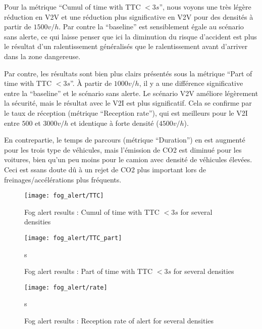 \documentclass[a4paper,10pt]{article}
\begin{document}
Pour la métrique ``Cumul of time with TTC $< 3 s$'', nous voyons une très légère réduction en V2V et une réduction plus significative en V2V pour des densités à partir de $1500 v/h$. Par contre la ``baseline'' est sensiblement égale au scénario sans alerte, ce qui laisse penser que ici la diminution du risque d'accident est plus le résultat d'un ralentissement généralisés que le ralentissement avant d'arriver dans la zone dangereuse.

Par contre, les résultats sont bien plus clairs présentés sous la métrique ``Part of time with TTC $< 3 s$''. À partir de $1000 v/h$, il y a une différence significative entre la ``baseline'' et le scénario sans alerte. Le scénario V2V améliore légèrement la sécurité, mais le résultat avec le V2I est plus significatif. Cela se confirme par le taux de réception (métrique ``Reception rate''), qui est meilleurs pour le V2I entre $500$ et $3000 v/h$ et identique à forte densité ($4500 v/h$).

En contrepartie, le temps de parcours (métrique ``Duration'') en est augmenté pour les trois type de véhicules, mais l’émission de CO2 est diminué pour les voitures, bien qu'un peu moins pour le camion avec densité de véhicules élevées. Ceci est ssans doute dû à un rejet de CO2 plus important lors de freinages/accélérations plus fréquents.

\begin{figure}[h!]
    \begin{center}
         \texttt{[image: fog\_alert/TTC]}
    \end{center}
  \caption{ Fog alert results : Cumul of time with TTC $< 3 s$ for several densities }
  \label{fig:ttc_part}
\end{figure}

\begin{figure}[h!]
    \begin{center}
         \texttt{[image: fog\_alert/TTC\_part]}
    \end{center}s
  \caption{ Fog alert results : Part of time with TTC $< 3 s$ for several densities}
  \label{fig:ttc_part}
\end{figure}

\begin{figure}[h!]
    \begin{center}
         \texttt{[image: fog\_alert/rate]}
    \end{center}s
  \caption{ Fog alert results : Reception rate of alert for several densities}
  \label{fig:ttc_part}
\end{figure}
\end{document}
